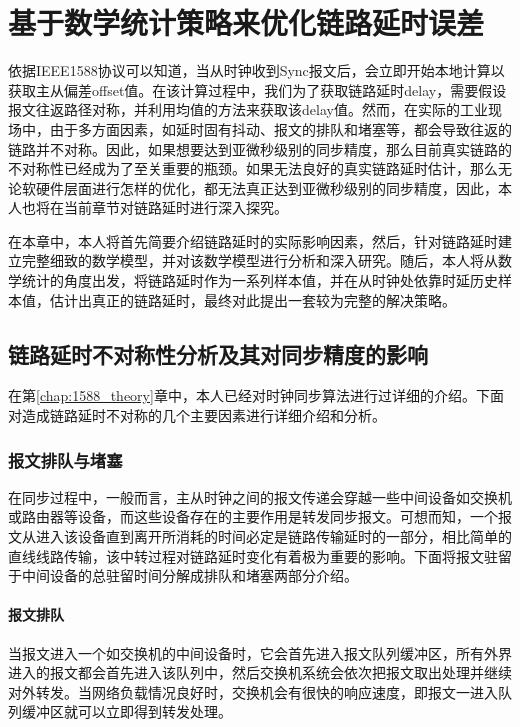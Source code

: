 
\chapter{基于数学统计策略来优化链路延时误差}
\label{chap:statistical_delay}
依据IEEE1588协议可以知道，当从时钟收到Sync报文后，会立即开始本地计算以获取主从偏差offset值。在该计算过程中，我们为了获取链路延时delay，需要假设报文往返路径对称，并利用均值的方法来获取该delay值。然而，在实际的工业现场中，由于多方面因素，如延时固有抖动、报文的排队和堵塞等，都会导致往返的链路并不对称。因此，如果想要达到亚微秒级别的同步精度，那么目前真实链路的不对称性已经成为了至关重要的瓶颈。如果无法良好的真实链路延时估计，那么无论软硬件层面进行怎样的优化，都无法真正达到亚微秒级别的同步精度，因此，本人也将在当前章节对链路延时进行深入探究。

在本章中，本人将首先简要介绍链路延时的实际影响因素，然后，针对链路延时建立完整细致的数学模型，并对该数学模型进行分析和深入研究。随后，本人将从数学统计的角度出发，将链路延时作为一系列样本值，并在从时钟处依靠时延历史样本值，估计出真正的链路延时，最终对此提出一套较为完整的解决策略。

\section{链路延时不对称性分析及其对同步精度的影响}
在第\ref{chap:1588_theory}章中，本人已经对时钟同步算法进行过详细的介绍。下面对造成链路延时不对称的几个主要因素进行详细介绍和分析。
\subsection{报文排队与堵塞}
在同步过程中，一般而言，主从时钟之间的报文传递会穿越一些中间设备如交换机或路由器等设备，而这些设备存在的主要作用是转发同步报文。可想而知，一个报文从进入该设备直到离开所消耗的时间必定是链路传输延时的一部分，相比简单的直线线路传输，该中转过程对链路延时变化有着极为重要的影响。下面将报文驻留于中间设备的总驻留时间分解成排队和堵塞两部分介绍。
\subsubsection{报文排队}
当报文进入一个如交换机的中间设备时，它会首先进入报文队列缓冲区，所有外界进入的报文都会首先进入该队列中，然后交换机系统会依次把报文取出处理并继续对外转发。当网络负载情况良好时，交换机会有很快的响应速度，即报文一进入队列缓冲区就可以立即得到转发处理。

